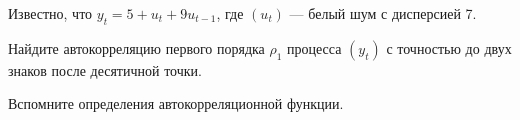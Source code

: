 
\begin{question}
Известно, что \(y_t = 5 + u_t + 9 u_{t-1}\), где \((u_t)\) --- белый шум с дисперсией 7.

Найдите автокорреляцию первого порядка \(\rho_1\) процесса \((y_t)\) с точностью до двух знаков после десятичной точки.
\end{question}

\begin{solution}
Вспомните определения автокорреляционной функции.
\end{solution}

